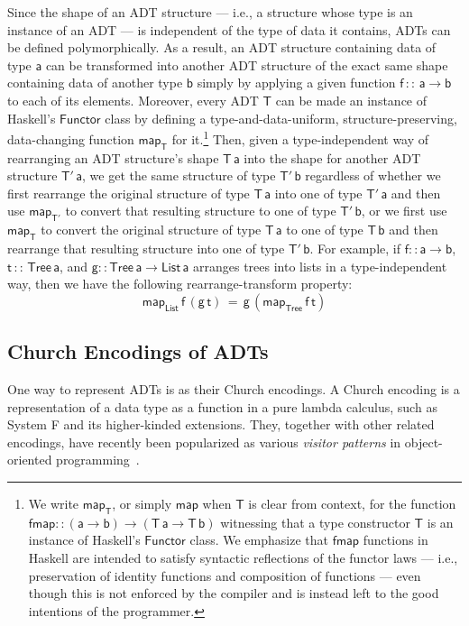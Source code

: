 \documentclass[submission,copyright,creativecommons]{eptcs}
\begin{document}
Since the shape of an ADT structure --- i.e., a structure whose type
is an instance of an ADT --- is independent of the type of data it
contains, ADTs can be defined polymorphically. As a result, an ADT
structure containing data of type $\mathsf{a}$ can be transformed into
another ADT structure of the exact same shape containing data of
another type $\mathsf{b}$ simply by applying a given function
$\mathsf{f \,::\,a \to b}$ to each of its elements. Moreover, every ADT
$\mathsf{T}$ can be made an instance of Haskell's $\mathsf{Functor}$
class by defining a type-and-data-uniform, structure-preserving,
data-changing function $\mathsf{map_T}$ for it.\footnote{We write
  $\mathsf{map_T}$, or simply $\mathsf{map}$ when $\mathsf{T}$ is
  clear from context, for the function $\mathsf{fmap :: (a \to b) \to
    (T\,a \to T\,b)}$ witnessing that a type constructor $\mathsf{T}$
  is an instance of Haskell's $\mathsf{Functor}$ class. We
  emphasize that $\mathsf{fmap}$ functions in Haskell are intended to
  satisfy syntactic reflections of the functor laws ---
  i.e., preservation of identity functions and composition of
  functions --- even though this is not enforced by the compiler and
  is instead left to the good intentions of the programmer.}
Then, given a type-independent way of rearranging an ADT
structure's shape $\mathsf{T\,a}$ into the shape for another ADT
structure $\mathsf{T'\,a}$, we get the same structure of type
$\mathsf{T'\,b}$ regardless of whether we first rearrange the original
structure of type $\mathsf{T\,a}$ into one of type $\mathsf{T'\,a}$
and then use $\mathsf{map_{T'}}$ to convert that resulting structure
to one of type $\mathsf{T'\,b}$, or we first use $\mathsf{map_T}$ to
convert the original structure of type $\mathsf{T\,a}$ to one of type
$\mathsf{T\,b}$ and then rearrange that resulting structure into one
of type $\mathsf{T'\,b}$. For example, if $\mathsf{f :: a \to b}$,
$\mathsf{t \,::\,Tree\,a}$, and $\mathsf{g :: Tree\,a\to List\,a}$
arranges trees into lists in a type-independent way, then we have the
following rearrange-transform property:
\[\mathsf{map_{List}\,f\,(g \, t) \,=\, g\,(map_{Tree}\,f\,t)}\]

\subsection{Church Encodings of ADTs}

One way to represent ADTs is as their Church encodings. A Church
encoding is a representation of a data type as a function in a pure
lambda calculus, such as System F and its higher-kinded
extensions. They, together with other related encodings, have recently
been popularized as various {\em visitor patterns} in object-oriented
programming~\cite{gon21,owg08}.
\end{document}

